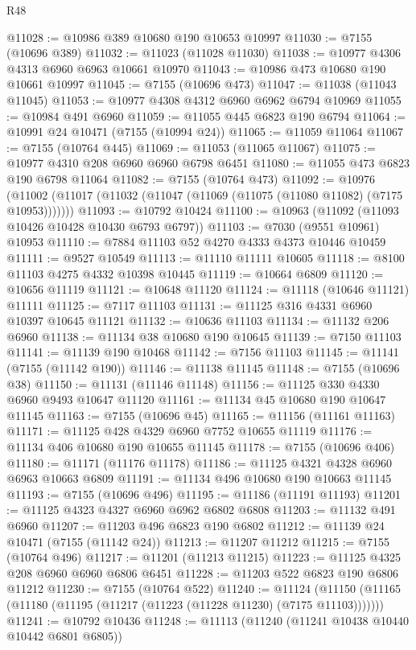 \begin{lexlean}{R48}
\begin{coremodule}
@11028 := @10986 @389 @10680 @190 @10653 @10997
@11030 := @7155 (@10696 @389)
@11032 := @11023 (@11028 @11030)
@11038 := @10977 @4306 @4313 @6960 @6963 @10661 @10970
@11043 := @10986 @473 @10680 @190 @10661 @10997
@11045 := @7155 (@10696 @473)
@11047 := @11038 (@11043 @11045)
@11053 := @10977 @4308 @4312 @6960 @6962 @6794 @10969
@11055 := @10984 @491 @6960
@11059 := @11055 @445 @6823 @190 @6794
@11064 := @10991 @24 @10471 (@7155 (@10994 @24))
@11065 := @11059 @11064
@11067 := @7155 (@10764 @445)
@11069 := @11053 (@11065 @11067)
@11075 := @10977 @4310 @208 @6960 @6960 @6798 @6451
@11080 := @11055 @473 @6823 @190 @6798 @11064
@11082 := @7155 (@10764 @473)
@11092 := @10976
    (@11002 (@11017 (@11032 (@11047 (@11069 (@11075 (@11080 @11082) (@7175 @10953)))))))
@11093 := @10792 @10424
@11100 := @10963 (@11092 (@11093 @10426 @10428 @10430 @6793 @6797))
@11103 := @7030 (@9551 @10961) @10953
@11110 := @7884 @11103 @52 @4270 @4333 @4373 @10446 @10459
@11111 := @9527 @10549
@11113 := @11110 @11111 @10605
@11118 := @8100 @11103 @4275 @4332 @10398 @10445
@11119 := @10664 @6809
@11120 := @10656 @11119
@11121 := @10648 @11120
@11124 := @11118 (@10646 @11121) @11111
@11125 := @7117 @11103
@11131 := @11125 @316 @4331 @6960 @10397 @10645 @11121
@11132 := @10636 @11103
@11134 := @11132 @206 @6960
@11138 := @11134 @38 @10680 @190 @10645
@11139 := @7150 @11103
@11141 := @11139 @190 @10468
@11142 := @7156 @11103
@11145 := @11141 (@7155 (@11142 @190))
@11146 := @11138 @11145
@11148 := @7155 (@10696 @38)
@11150 := @11131 (@11146 @11148)
@11156 := @11125 @330 @4330 @6960 @9493 @10647 @11120
@11161 := @11134 @45 @10680 @190 @10647 @11145
@11163 := @7155 (@10696 @45)
@11165 := @11156 (@11161 @11163)
@11171 := @11125 @428 @4329 @6960 @7752 @10655 @11119
@11176 := @11134 @406 @10680 @190 @10655 @11145
@11178 := @7155 (@10696 @406)
@11180 := @11171 (@11176 @11178)
@11186 := @11125 @4321 @4328 @6960 @6963 @10663 @6809
@11191 := @11134 @496 @10680 @190 @10663 @11145
@11193 := @7155 (@10696 @496)
@11195 := @11186 (@11191 @11193)
@11201 := @11125 @4323 @4327 @6960 @6962 @6802 @6808
@11203 := @11132 @491 @6960
@11207 := @11203 @496 @6823 @190 @6802
@11212 := @11139 @24 @10471 (@7155 (@11142 @24))
@11213 := @11207 @11212
@11215 := @7155 (@10764 @496)
@11217 := @11201 (@11213 @11215)
@11223 := @11125 @4325 @208 @6960 @6960 @6806 @6451
@11228 := @11203 @522 @6823 @190 @6806 @11212
@11230 := @7155 (@10764 @522)
@11240 := @11124
    (@11150 (@11165 (@11180 (@11195 (@11217 (@11223 (@11228 @11230) (@7175 @11103)))))))
@11241 := @10792 @10436
@11248 := @11113 (@11240 (@11241 @10438 @10440 @10442 @6801 @6805))

\end{coremodule}
\end{lexlean}
